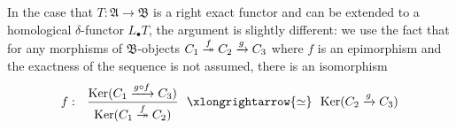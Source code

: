 \documentclass[12pt,b5paper,notitlepage]{report}
\theoremstyle{definition}
\theoremstyle{plain}
\newcommand{\fk}{\mathfrak}
\newcommand{\blt}{\bullet}
\newcommand{\Ker}{\mathrm{Ker}}
\numberwithin{equation}{section}
\begin{document}
In the case that $T:\fk A\rightarrow\fk B$ is a right exact functor and can be extended to a homological $\delta$-functor $L_\blt T$, the argument is slightly different: we use the fact that for any morphisms of $\fk B$-objects $C_1\overset{\begin{subarray}{c}
f\\[-0.6ex]
\end{subarray}}{\twoheadrightarrow}C_2\xrightarrow{g}C_3$ where $f$ is an epimorphism and the exactness of the sequence is not assumed, there is an isomorphism
\begin{align}\label{eq113}
f:~~\frac{\Ker(C_1\xrightarrow{g\circ f}C_3)}{\Ker(C_1\overset{
\begin{subarray}{c}
f\\[-0.6ex]
\end{subarray}
}{\twoheadrightarrow}C_2)}~~\xlongrightarrow{\simeq}~~\Ker(C_2\xrightarrow{g}C_3)
\end{align}
\end{document}
